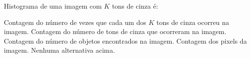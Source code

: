 \documentclass[12pt, addpoints]{exam}
\begin{document}
\begin{questions}
\question

Histograma de uma imagem com \( K \) tons de cinza é:
\begin{choices}
\choice Contagem do número de vezes que cada um dos \( K \) tons de cinza ocorreu na imagem.
\choice Contagem do número de tons de cinza que ocorreram na imagem.
\choice Contagem do número de objetos encontrados na imagem.
\choice Contagem dos pixels da imagem.
\choice Nenhuma alternativa acima.
\end{choices}



    \end{questions}
    
\end{document}
